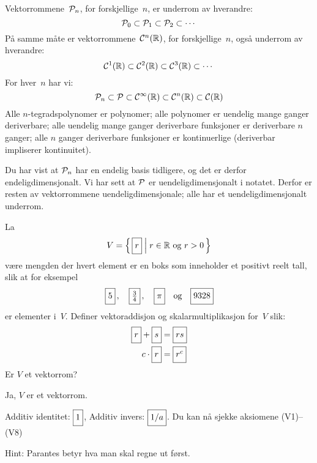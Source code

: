 \begin{losning}

\begin{punkt}
Vektorrommene~$\P_n$, for forskjellige~$n$, er underrom av hverandre:
\[
\P_0 \subset \P_1 \subset \P_2 \subset \cdots
\]
På samme måte er vektorrommene~$\Cf^n(\R)$, for forskjellige~$n$, også
underrom av hverandre:
\[
\Cf^1(\R) \subset \Cf^2(\R) \subset \Cf^3(\R) \subset \cdots
\]
For hver~$n$ har vi:
\[
\P_n \subset \P \subset \Cf^\infty(\R) \subset \Cf^n(\R) \subset \Cf(\R)
\]
Alle $n$-tegradspolynomer er polynomer;
alle polynomer er uendelig mange ganger deriverbare;
alle uendelig mange ganger deriverbare funksjoner er deriverbare $n$ ganger;
alle $n$ ganger deriverbare funksjoner er kontinuerlige (deriverbar impliserer kontinuitet).
\end{punkt}

\begin{punkt}
Du har vist at $\P_n$ har en endelig basis tidligere, og det er derfor endeligdimensjonalt.
Vi har sett at $\P$ er uendeligdimensjonalt i notatet.
Derfor er resten av vektorrommene uendeligdimensjonale; alle har et uendeligdimensjonalt underrom. 
\end{punkt}


\end{losning}



\begin{oppgave}
La
\[
V = \left\{\, \boks{r} \;\middle|\; \text{$r \in \R$ og $r > 0$} \,\right\}
\]
være mengden der hvert element er en boks som inneholder et positivt reelt tall,
slik at for eksempel
\[
\boks{5}\,,\quad
\boks{\frac{3}{4}}\,,\quad
\boks{\pi}\quad\text{og}\quad
\boks{9328}
\]
er elementer i~$V$.  Definer vektoraddisjon og skalarmultiplikasjon
for~$V$ slik:
\begin{align*}
\boks{r} + \boks{s} &= \boks{rs} \\
c \cdot \boks{r}    &= \boks{r^c}
\end{align*}
Er $V$ et vektorrom?
\end{oppgave}

\begin{losning}
Ja, $V$ er et vektorrom.

Additiv identitet: $\boks{1}$, Additiv invers: $\boks{1/a}$. Du kan nå sjekke aksiomene (V1)--(V8)

Hint: Parantes betyr hva man skal regne ut først.
\end{losning}

